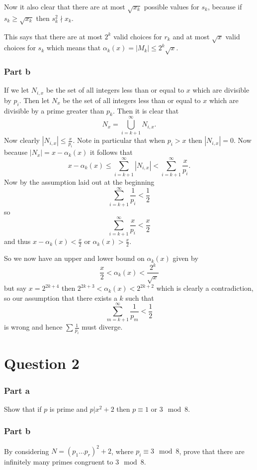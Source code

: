 \documentclass{unswmaths}
\begin{document}
Now it also clear that there are at most $ \sqrt{x_k} $ possible
values for $ s_k $, because if $ s_k \geq \sqrt{x_k} $ then $ s_k^2 \nmid x_k $. 

This says that there are at most $ 2^k $ valid choices for $ r_k $ and at most $ \sqrt{x} $ valid choices for $ s_k $ which means that $ \alpha_k(x) = |M_k| \leq 2^k \sqrt{x} $.

\subsubsection*{Part b}
If we let $ N_{i,x} $ be the set of all integers less than or equal to $ x $ which are divisible by $ p_i $. Then let $ N_x $ be the set of all integers less than or equal to $ x $ 
which are divisible by a prime greater than $ p_k $. Then it is clear that 
$$
	N_x = \bigcup_{i=k+1}^{\infty} N_{i,x}.
$$
Now clearly $ | N_{i,x} | \leq \frac{x}{p_i} $. Note in particular that when $ p_i > x $ then $ | N_{i,x} | = 0 $. Now because $ |N_x| = x - \alpha_k(x) $ it follows that
$$ x  - \alpha_k(x) \leq \sum_{i = k + 1 }^\infty |N_{i,x}| < \sum_{i=k+1}^\infty \frac{x}{p_i}. $$
Now by the assumption laid out at the beginning 
$$ \sum_{i = k + 1}^\infty \frac{1}{p_i} < \frac{1}{2} $$ so $$ \sum_{i=k+1}^\infty \frac{x}{p_i} < \frac{x}{2} $$
and thus $ x - \alpha_k(x) < \frac{x}{2} $ or $ \alpha_{k}(x) > \frac{x}{2} $.

So we now have an upper and lower bound on $ \alpha_k(x) $ given by
$$
	\frac{x}{2} < \alpha_k(x) < \frac{2^k}{\sqrt{x}}
$$
but say $ x = 2^{2k+4} $ then $ 2^{2k+3} < \alpha_k(x) < 2^{2k+2} $ which is clearly a contradiction,
so our assumption that there exists a $ k $ such that 
$$
	\sum_{m=k+1}^\infty \frac{1}{p_m} < \frac{1}{2} 
$$
is wrong and hence $ \sum \frac{1}{p_i} $ must diverge.
\section*{Question 2}
\subsubsection*{Part a}
Show that if  $ p $ is prime and $ p | x^2 + 2 $ then $ p \equiv 1 $ or $ 3 \mod 8 $.
\subsubsection*{Part b}
By considering $ N = (p_1 \ldots p_r)^2 + 2 $, where $ p_i \equiv 3 \mod 8 $, prove 
that there are infinitely many primes congruent to $ 3 \mod 8 $.
\end{document}

